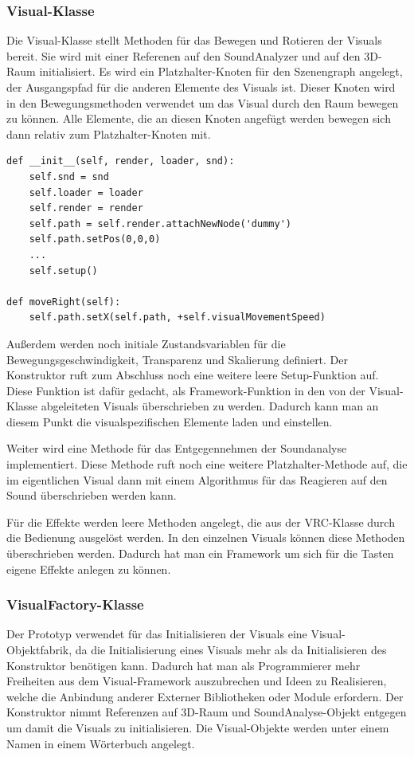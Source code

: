 \subsubsection{Visual-Klasse}

Die Visual-Klasse stellt Methoden f\"ur das Bewegen und Rotieren der Visuals bereit. Sie wird mit einer Referenen
auf den SoundAnalyzer und auf den 3D-Raum initialisiert.
Es wird ein Platzhalter-Knoten f\"ur den Szenengraph angelegt, der Ausgangspfad f\"ur die anderen Elemente des Visuals ist.
Dieser Knoten wird in den Bewegungsmethoden verwendet um das Visual durch den Raum bewegen zu k\"onnen. Alle Elemente,
die an diesen Knoten angef\"ugt werden bewegen sich dann relativ zum Platzhalter-Knoten mit.

\begin{lstlisting}
def __init__(self, render, loader, snd):
    self.snd = snd
    self.loader = loader
    self.render = render
    self.path = self.render.attachNewNode('dummy')
    self.path.setPos(0,0,0)
    ...
    self.setup()

def moveRight(self):
    self.path.setX(self.path, +self.visualMovementSpeed)
\end{lstlisting}

Au\ss{}erdem werden noch initiale Zustandsvariablen f\"ur die Bewegungsgeschwindigkeit, Transparenz und Skalierung definiert.
Der Konstruktor ruft zum Abschluss noch eine weitere leere Setup-Funktion auf. Diese Funktion ist daf\"ur gedacht,
als Framework-Funktion in den von der Visual-Klasse abgeleiteten Visuals \"uberschrieben zu werden. Dadurch kann man
an diesem Punkt die visualspezifischen Elemente laden und einstellen.

Weiter wird eine Methode f\"ur das Entgegennehmen der Soundanalyse implementiert. Diese Methode ruft noch eine weitere
Platzhalter-Methode auf, die im eigentlichen Visual dann mit einem Algorithmus f\"ur das Reagieren auf den Sound
\"uberschrieben werden kann.

F\"ur die Effekte werden leere Methoden angelegt, die aus der VRC-Klasse durch die Bedienung ausgel\"ost werden. In den
einzelnen Visuals k\"onnen diese Methoden \"uberschrieben werden. Dadurch hat man ein Framework um sich f\"ur die
Tasten eigene Effekte anlegen zu k\"onnen.

\subsubsection{VisualFactory-Klasse}

Der Prototyp verwendet f\"ur das Initialisieren der Visuals eine Visual-Objektfabrik, da die Initialisierung eines Visuals
mehr als da Initialisieren des Konstruktor ben\"otigen kann. Dadurch hat man als Programmierer mehr Freiheiten aus dem
Visual-Framework auszubrechen und Ideen zu Realisieren, welche die Anbindung anderer Externer Bibliotheken oder Module
erfordern.
Der Konstruktor nimmt Referenzen auf 3D-Raum und SoundAnalyse-Objekt entgegen um damit die Visuals zu initialisieren.
Die Visual-Objekte werden unter einem Namen in einem W\"orterbuch angelegt.

